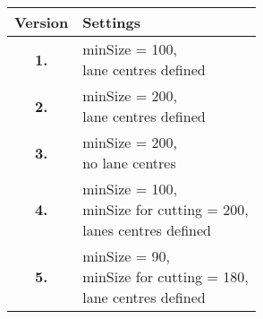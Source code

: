 \begin{tabular}{cl}
	\toprule
	\textbf{Version} & \textbf{Settings}                                                                                   \\ \midrule
	\textbf{1.}      & \makecell[l]{minSize = 100, \\
		 lane centres defined}          \\

	\textbf{2.}      & \makecell[l]{minSize = 200,\\ lane centres defined}                              \\

	\textbf{3.}      & \makecell[l]{minSize = 200,\\ no lane centres}     \\   
           
	\textbf{4.}      & \makecell[l]{minSize = 100,\\ minSize for cutting = 200,\\ lanes centres defined} \\

	\textbf{5.}      & \makecell[l]{minSize = 90,\\ minSize for cutting = 180,\\ lane centres defined} \\
	\bottomrule
\end{tabular}